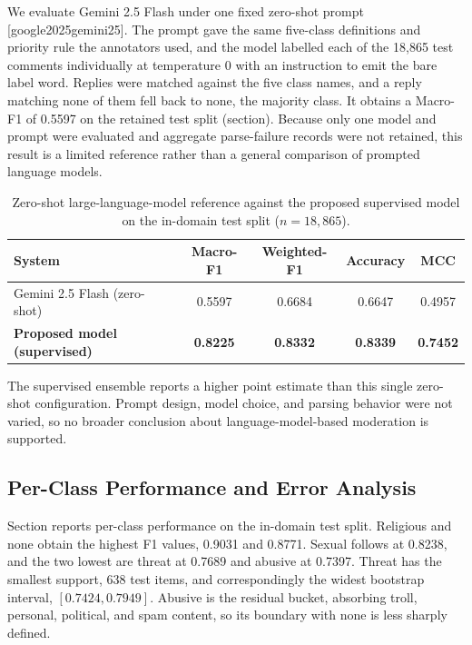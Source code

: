 \documentclass[11pt,a4paper]{article}
\def\citep#1{[#1]}%
\def\Cref#1{Section}%
\def\cref#1{section}%
\def\emph#1{#1}%
\begin{document}
We evaluate Gemini 2.5 Flash under one fixed zero-shot prompt \citep{google2025gemini25}. The prompt gave the same five-class definitions and priority rule the annotators used, and the model labelled each of the 18{,}865 test comments individually at temperature $0$ with an instruction to emit the bare label word. Replies were matched against the five class names, and a reply matching none of them fell back to \emph{none}, the majority class. It obtains a Macro-F1 of 0.5597 on the retained test split (\cref{tab:llm}). Because only one model and prompt were evaluated and aggregate parse-failure records were not retained, this result is a limited reference rather than a general comparison of prompted language models.

\begin{table}[!htbp]
\centering
\caption{Zero-shot large-language-model reference against the proposed supervised model on the in-domain test split ($n = 18{,}865$).}
\label{tab:llm}
\small
\begin{tabular}{@{}lcccc@{}}
\toprule
\textbf{System} & \textbf{Macro-F1} & \textbf{Weighted-F1} & \textbf{Accuracy} & \textbf{MCC} \\
\midrule
Gemini 2.5 Flash (zero-shot) & 0.5597 & 0.6684 & 0.6647 & 0.4957 \\
\textbf{Proposed model (supervised)} & \textbf{0.8225} & \textbf{0.8332} & \textbf{0.8339} & \textbf{0.7452} \\
\bottomrule
\end{tabular}
\end{table}

The supervised ensemble reports a higher point estimate than this single zero-shot configuration. Prompt design, model choice, and parsing behavior were not varied, so no broader conclusion about language-model-based moderation is supported.

\subsection{Per-Class Performance and Error Analysis}
\label{sec:perclass-results}

\Cref{tab:perclass} reports per-class performance on the in-domain test split. \emph{Religious} and \emph{none} obtain the highest F1 values, 0.9031 and 0.8771. \emph{Sexual} follows at 0.8238, and the two lowest are \emph{threat} at 0.7689 and \emph{abusive} at 0.7397. \emph{Threat} has the smallest support, 638 test items, and correspondingly the widest bootstrap interval, $[0.7424, 0.7949]$. \emph{Abusive} is the residual bucket, absorbing troll, personal, political, and spam content, so its boundary with \emph{none} is less sharply defined.
\end{document}
